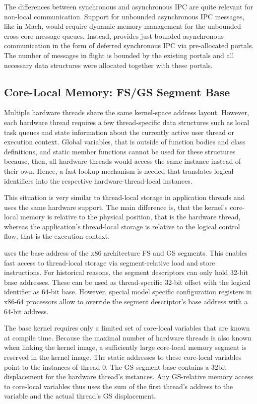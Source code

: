 The differences between synchronous and asynchronous IPC are quite relevant for non-local communication. Support for unbounded asynchronous IPC messages, like in Mach, would require dynamic memory management for the unbounded cross-core message queues. Instead, \mythos provides just bounded asynchronous communication in the form of deferred synchronous IPC via pre-allocated portals. The number of messages in flight is bounded by the existing portals and all necessary data structures were allocated together with these portals.     

\subsection{Core-Local Memory: FS/GS Segment Base}
Multiple hardware threads share the same kernel-space address layout. However, each hardware thread requires a few thread-specific data structures such as local task queues and state information about the currently active user thread or execution context. Global variables, that is outside of function bodies and class definitions, and static member functions cannot be used for these structures because, then, all hardware threads would access the same instance instead of their own. Hence, a fast lookup mechanism is needed that translates logical identifiers into the respective hardware-thread-local instances.

This situation is very similar to thread-local storage in application threads and uses the same hardware support. The main difference is, that the kernel's core-local memory is relative to the physical position, that is the hardware thread, whereas the application's thread-local storage is relative to the logical control flow, that is the execution context.

\mythos uses the base address of the x86 architecture FS and GS segments. This enables fast access to thread-local storage via segment-relative load and store instructions. For historical reasons, the segment descriptors can only hold 32-bit base addresses. These can be used as thread-specific 32-bit offset with the logical identifier as 64-bit base. However, special model specific configuration registers in x86-64 processors allow to override the segment descriptor's base address with a 64-bit address.

The base kernel requires only a limited set of core-local variables that are known at compile time. Because the maximal number of hardware threads is also known when linking the kernel image, a sufficiently large core-local memory segment is reserved in the kernel image. The static addresses to these core-local variables point to the instances of thread 0. The GS segment base contains a 32bit displacement for the hardware thread's instances. Any GS-relative memory access to core-local variables thus uses the sum of the first thread's address to the variable and the actual thread's GS displacement. 

